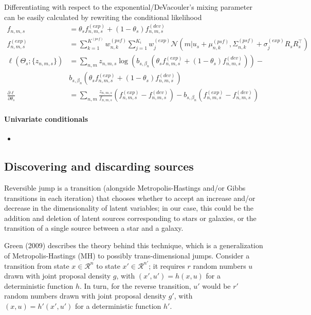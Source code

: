 \documentclass[11pt]{article}
\newcommand{\trans}{\intercal}
\begin{document}
Differentiating with respect to the exponential/DeVacouler's mixing parameter can be easily calculated by rewriting the conditional likelihood
\begin{align}
  f_{n,m,s} &= \theta_s f^{(exp)}_{n,m,s} + (1 - \theta_s) f^{(dev)}_{n,m,s} \\
  f^{(exp)}_{n,m,s} 
    &= \sum_{k=1}^{K^{(psf)}} w_{n,k}^{(psf)} \sum_{j=1}^{K_i} w_j^{(exp)} \mathcal{N} \left(m | u_s + \mu^{(psf)}_{n,k}, \Sigma^{(psf)}_{n,k} + \sigma_j^{(exp)} R_s R_s^\trans \right) \\
  \ell(\Theta_s; \{z_{n,m,s}\}) 
    &= \sum_{n,m} z_{n,m,s} \log\left( b_{s, \beta_n} (\theta_s f^{(exp)}_{n,m,s} + (1 - \theta_s) f^{(dev)}_{n,m,s})\right) - \\
    & b_{s, \beta_n} (\theta_s f^{(exp)}_{n,m,s} + (1 - \theta_s) f^{(dev)}_{n,m,s})  \\ 
  \frac{\partial \ell}{\partial \theta_s} 
    &= \sum_{n,m} \frac{z_{n,m,s}}{f_{n,m,s}} \left(f^{(exp)}_{n,m,s} - f^{(dev)}_{n,m,s}\right) -
       b_{s,\beta_n} \left(f^{(exp)}_{n,m,s} - f^{(dev)}_{n,m,s}\right)
\end{align}





\paragraph{Univariate conditionals}
\begin{itemize}
\item 
\end{itemize}

\subsection{Discovering and discarding sources}

Reversible jump is a transition (alongside Metropolis-Hastings and/or
Gibbs transitions in each iteration) that chooses whether to accept
an increase and/or decrease in the dimensionality of latent variables;
in our case, this could be the addition and deletion of latent sources
corresponding to stars or galaxies, or the transition of a single
source between a star and a galaxy.

Green (2009) describes the theory behind this technique, which is
a generalization of Metropolis-Hastings (MH) to possibly trans-dimensional
jumps. Consider a transition from state $x\in\mathcal{R}^{n}$ to
state $x'\in\mathcal{R}^{n'}$; it requires $r$ random numbers $u$
drawn with joint proposal density $g$, with $\left(x',u'\right)=h\left(x,u\right)$
for a deterministic function $h$. In turn, for the reverse transition,
$u'$ would be $r'$ random numbers drawn with joint proposal density
$g'$, with $\left(x,u\right)=h'\left(x',u'\right)$ for a deterministic
function $h'$.
\end{document}
